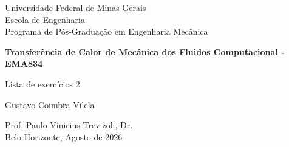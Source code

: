\begin{titlepage}
\begin{center}
{\large Universidade Federal de Minas Gerais\\
Escola de Engenharia \\
Programa de Pós-Graduação em Engenharia Mecânica\\}

\vspace{6cm}
{\bf\Large Transferência de Calor de Mecânica dos Fluidos Computacional - EMA834\vspace{1.0cm}

Lista de exercícios 2}
\vspace{4cm}

{\large Gustavo Coimbra Vilela}
\vspace{2cm}  
   
\vspace{2cm}          
{\large Prof. Paulo Vinicius Trevizoli, Dr.}\\


\vfill
{\large Belo Horizonte, Agosto de 2026 }
\end{center}

\end{titlepage}